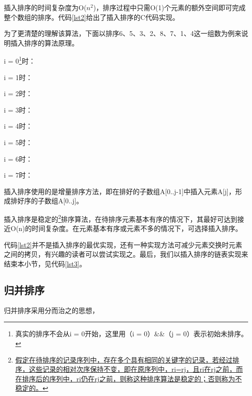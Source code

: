 \documentclass[a4paper, 12pt, titlepage]{article}
\newlength{\du}
\begin{document}
插入排序的时间复杂度为O(${n}^{2}$)，排序过程中只需O(1)个元素的额外空间即可完成整个数组的排序。代码\ref{lst2}给出了插入排序的C代码实现。
\begin{spacing}{1.0}
  
\end{spacing}


为了更清楚的理解该算法，下面以排序6、5、3、2、8、7、1、4这一组数为例来说明插入排序的算法原理。

\captionsetup[figure]{labelformat=empty}

i = 0\footnote{真实的排序不会从i = 0开始，这里用（i = 0）\&\&（j = 0）表示初始未排序。}时：


i = 1时：


i = 2时：


i = 3时：


i = 4时：


i = 5时：


i = 6时：


i = 7时：


插入排序使用的是增量排序方法，即在排好的子数组A[0..j-1]中插入元素A[j]，形成排好序的子数组A[0..j]。

插入排序是稳定的\footnote{\href{http://baike.baidu.com/view/547325.htm?fr=aladdin}{假定在待排序的记录序列中，存在多个具有相同的关键字的记录，若经过排序，这些记录的相对次序保持不变，即在原序列中，ri=rj，且ri在rj之前，而在排序后的序列中，ri仍在rj之前，则称这种排序算法是稳定的；否则称为不稳定的。}}排序算法，在待排序元素基本有序的情况下，其最好可达到接近O(n)的时间复杂度。在元素基本有序或元素不多的情况下，可选择插入排序。

代码\ref{lst2}并不是插入排序的最优实现，还有一种实现方法可减少元素交换时元素之间的拷贝，有兴趣的读者可以尝试实现之。最后，我们以插入排序的链表实现来结束本小节，见代码\ref{lst3}。
\begin{spacing}{1.0}
  
\end{spacing}

\subsection{归并排序}
\label{subsec:merge_sort}
归并排序采用分而治之的思想，
\end{document}
